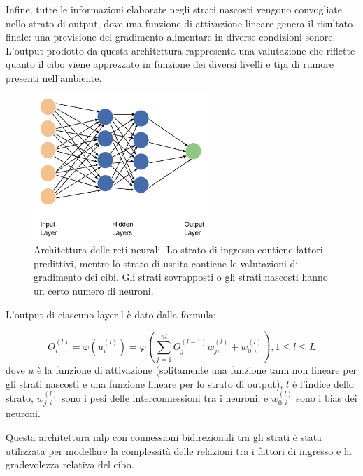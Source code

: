 Infine, tutte le informazioni elaborate negli strati nascosti vengono convogliate nello strato di output, dove una funzione di attivazione lineare genera il risultato finale: una previsione del gradimento alimentare in diverse condizioni sonore. L'output prodotto da questa architettura rappresenta una valutazione che riflette quanto il cibo viene apprezzato in funzione dei diversi livelli e tipi di rumore presenti nell'ambiente.

\begin{figure}[H]
      \centering
      \includegraphics[width=0.6\textwidth]{Chapters/Figures/ArchitectureANN.png}
      \caption{\small Architettura delle reti neurali. Lo strato di ingresso contiene fattori predittivi, mentre lo strato di uscita contiene le valutazioni di gradimento dei cibi. Gli strati sovrapposti o gli strati nascosti hanno un certo numero di neuroni. \cite{alamir2021enhanced}}
      \label{fig:architectureann}
  \end{figure}

  L'output di ciascuno layer l è dato dalla formula:

\begin{equation}
  O_i^{(l)} = \varphi(u_i^{(l)}) = \varphi(\sum_{j=1}^{nl} O_j^{(l-1)} w_{ji}^{(l)} + w_{0,i}^{(l)}), 1 \le l \le L
\end{equation}
  dove $u$ è la funzione di attivazione (solitamente una funzione \gls{tanh} non lineare per gli strati nascosti e una funzione lineare per lo strato di output), $l$ è l'indice dello strato, $w_{j,i}^{(l)}$ sono i pesi delle interconnessioni tra i neuroni, e $w_{0,i}^{(l)}$ sono i bias dei neuroni.

  Questa architettura \gls{mlp} con connessioni bidirezionali tra gli strati è stata utilizzata per modellare la complessità delle relazioni tra i fattori di ingresso e la gradevolezza relativa del cibo.

